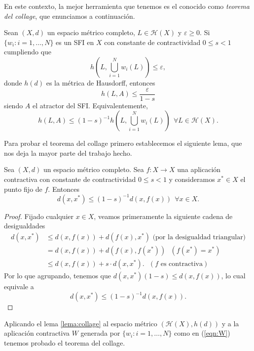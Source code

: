 En este contexto, la mejor herramienta que tenemos es el conocido como \textit{teorema del collage}, que enunciamos a continuación.

\begin{teorema}
    \label{th:collage}
    Sean $(X,d)$ un espacio métrico completo, $L\in\mathcal{H}(X)$ y $\varepsilon\geq 0$. Si $\{w_i:i=1,\dots,N\}$ es un SFI en $X$ con constante de contractividad $0\leq s < 1$ cumpliendo que
    $$
    h\left(L,\bigcup_{i=1}^N w_i(L)\right) \leq \varepsilon,
    $$
    donde $h(d)$ es la métrica de Hausdorff, entonces
    $$
    h(L,A)\leq \dfrac{\varepsilon}{1-s}
    $$
    siendo $A$ el atractor del SFI. Equivalentemente,
    $$
    h(L,A)\leq(1-s)^{-1} h\left(L, \bigcup_{i=1}^N w_i(L)\right) \ \ \forall L\in\mathcal{H}(X).
    $$
\end{teorema}

Para probar el teorema del collage primero establecemos el siguiente lema, que nos deja la mayor parte del trabajo hecho.

\begin{lema}
    Sea $(X,d)$ un espacio métrico completo. Sea $f:X\longrightarrow X$ una aplicación contractiva con constante de contractividad $0\leq s < 1$ y consideramos $x^*\in X$ el punto fijo de $f$. Entonces
    $$
    d(x,x^*)\leq (1-s)^{-1} d(x,f(x)) \ \ \forall x\in X.
    $$
    \label{lema:collage}
\end{lema}
\begin{proof}
    Fijado cualquier $x\in X$, veamos primeramente la siguiente cadena de desigualdades
    \begin{equation*}
        \begin{split}
            d(x,x^*) & \leq d(x,f(x)) + d(f(x),x^*) \text{ (por la desigualdad triangular)} \\
            & = d(x,f(x)) + d(f(x),f(x^*)) \ \ \ (f(x^*)=x^*) \\
            & \leq d(x,f(x)) + s \cdot d(x,x^*). \ \ \ (f \text{ es contractiva})
        \end{split}
    \end{equation*}
    Por lo que agrupando, tenemos que $d(x,x^*)(1-s)\leq d(x,f(x))$, lo cual equivale a
    $$
    d(x,x^*)\leq (1-s)^{-1} d(x,f(x)).
    $$
\end{proof}

Aplicando el lema \ref{lema:collage} al espacio métrico $(\mathcal{H}(X), h(d))$ y a la aplicación contractiva $W$ generada por $\{w_i:i=1,\dots,N\}$ como en (\ref{eqn:W}) tenemos probado el teorema del collage.

